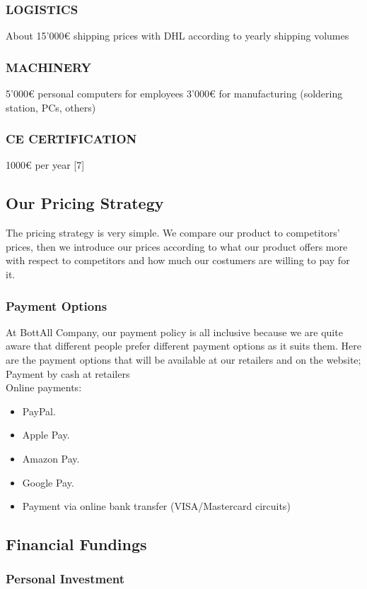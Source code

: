 \subsubsection*{LOGISTICS}
About 15’000€ shipping prices with DHL according to yearly shipping volumes
\subsubsection*{MACHINERY} 
5’000€ personal computers for employees
3’000€ for manufacturing (soldering station, PCs, others)
\subsubsection*{CE CERTIFICATION}
1000€ per year [7]

\subsection{Our Pricing Strategy}
The pricing strategy is very simple. We compare our product to competitors' prices, then we introduce our prices according to what our product offers more with respect to competitors and how much our costumers are willing to pay for it.
\subsubsection*{Payment Options}
At BottAll Company, our payment policy is all inclusive because we are quite aware that different people prefer different payment options as it suits them. Here are the payment options that will be available at our retailers and on the website;\\
Payment by cash at retailers\\
Online payments:
\begin{itemize}
\item PayPal.
\item Apple Pay.
\item Amazon Pay.
\item Google Pay.
\item Payment via online bank transfer (VISA/Mastercard circuits)
\end{itemize}

\subsection{Financial Fundings}
\subsubsection*{Personal Investment}

